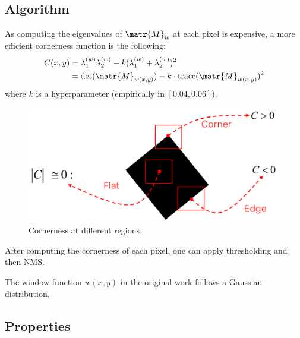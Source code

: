 \subsection{Algorithm}

As computing the eigenvalues of $\matr{M}_w$ at each pixel is expensive, a more efficient cornerness function is the following:
\[ 
    \begin{split}
        C(x, y) &= \lambda_1^{(w)}\lambda_2^{(w)} - k(\lambda_1^{(w)} + \lambda_2^{(w)})^2 \\
        &= \det(\matr{M}_{w(x,y)}) - k \cdot \text{trace}(\matr{M}_{w(x,y)})^2 
    \end{split}
\]
where $k$ is a hyperparameter (empirically in $[0.04, 0.06]$).

\begin{figure}[H]
    \centering
    \includegraphics[width=0.5\linewidth]{./img/_harris_efficient.pdf}
    \caption{Cornerness at different regions.}
\end{figure}

After computing the cornerness of each pixel, one can apply thresholding and then NMS.

\begin{remark}
    The window function $w(x, y)$ in the original work follows a Gaussian distribution.
\end{remark}


\subsection{Properties}

